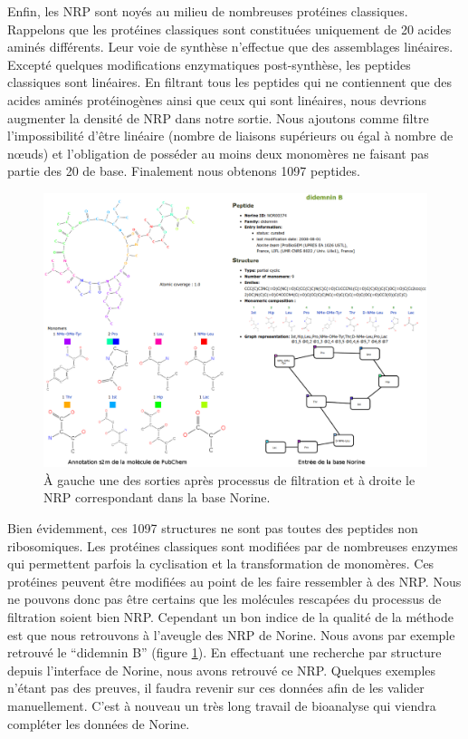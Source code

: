 Enfin, les NRP sont noyés au milieu de nombreuses protéines classiques.
Rappelons que les protéines classiques sont constituées uniquement de 20 acides aminés différents.
Leur voie de synthèse n'effectue que des assemblages linéaires.
Excepté quelques modifications enzymatiques post-synthèse, les peptides classiques sont linéaires.
En filtrant tous les peptides qui ne contiennent que des acides aminés protéinogènes ainsi que ceux qui sont linéaires, nous devrions augmenter la densité de NRP dans notre sortie.
Nous ajoutons comme filtre l'impossibilité d'être linéaire (nombre de liaisons supérieurs ou égal à nombre de nœuds) et l'obligation de posséder au moins deux monomères ne faisant pas partie des 20 de base.
Finalement nous obtenons 1097 peptides.

\begin{figure}[h!]
  \begin{center}
    \includegraphics[width=450px]{Figures/contributions/didemnin_B.png}
    \caption{\label{didemin}À gauche une des sorties après processus de filtration et à droite le NRP correspondant dans la base Norine.}
  \end{center}
\end{figure}

Bien évidemment, ces 1097 structures ne sont pas toutes des peptides non ribosomiques.
Les protéines classiques sont modifiées par de nombreuses enzymes qui permettent parfois la cyclisation et la transformation de monomères.
Ces protéines peuvent être modifiées au point de les faire ressembler à des NRP.
Nous ne pouvons donc pas être certains que les molécules rescapées du processus de filtration soient bien NRP.
Cependant un bon indice de la qualité de la méthode est que nous retrouvons à l'aveugle des NRP de Norine.
Nous avons par exemple retrouvé le ``didemnin B'' (figure \ref{didemin}).
En effectuant une recherche par structure depuis l'interface de Norine, nous avons retrouvé ce NRP.
Quelques exemples n'étant pas des preuves, il faudra revenir sur ces données afin de les valider manuellement.
C'est à nouveau un très long travail de bioanalyse qui viendra compléter les données de Norine.




